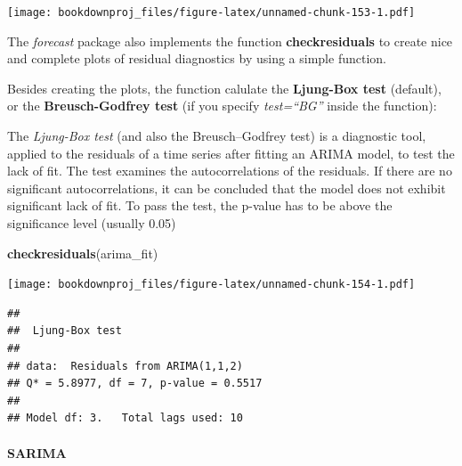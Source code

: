 \documentclass[
]{article}
\newenvironment{Shaded}{\begin{snugshade}}{\end{snugshade}}
\newcommand{\DataTypeTok}[1]{\textcolor[rgb]{0.13,0.29,0.53}{#1}}
\newcommand{\DecValTok}[1]{\textcolor[rgb]{0.00,0.00,0.81}{#1}}
\newcommand{\KeywordTok}[1]{\textcolor[rgb]{0.13,0.29,0.53}{\textbf{#1}}}
\newcommand{\NormalTok}[1]{#1}
\newcommand{\OperatorTok}[1]{\textcolor[rgb]{0.81,0.36,0.00}{\textbf{#1}}}
\newcommand{\StringTok}[1]{\textcolor[rgb]{0.31,0.60,0.02}{#1}}
\begin{document}
\begin{Shaded}
\end{Shaded}

\texttt{[image: bookdownproj\_files/figure-latex/unnamed-chunk-153-1.pdf]}

The \emph{forecast} package also implements the function \textbf{checkresiduals} to create nice and complete plots of residual diagnostics by using a simple function.

Besides creating the plots, the function calulate the \textbf{Ljung-Box test} (default), or the \textbf{Breusch-Godfrey test} (if you specify \emph{test=``BG''} inside the function):

The \emph{Ljung-Box test} (and also the Breusch--Godfrey test) is a diagnostic tool, applied to the residuals of a time series after fitting an ARIMA model, to test the lack of fit. The test examines the autocorrelations of the residuals. If there are no significant autocorrelations, it can be concluded that the model does not exhibit significant lack of fit. To pass the test, the p-value has to be above the significance level (usually 0.05)

\begin{Shaded}
\begin{Highlighting}[]
\KeywordTok{checkresiduals}\NormalTok{(arima_fit)}
\end{Highlighting}
\end{Shaded}

\texttt{[image: bookdownproj\_files/figure-latex/unnamed-chunk-154-1.pdf]}

\begin{verbatim}
## 
##  Ljung-Box test
## 
## data:  Residuals from ARIMA(1,1,2)
## Q* = 5.8977, df = 7, p-value = 0.5517
## 
## Model df: 3.   Total lags used: 10
\end{verbatim}

\hypertarget{sarima}{%
\paragraph{SARIMA}\label{sarima}}
\end{document}
